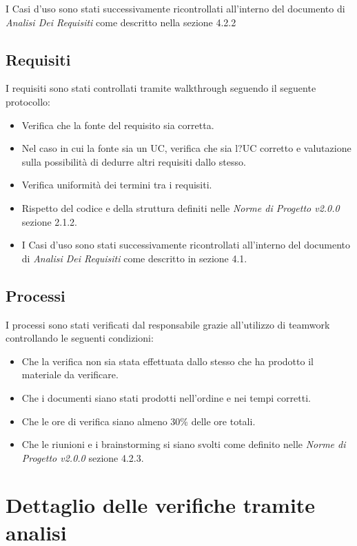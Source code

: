 \documentclass[a4paper]{article}
\begin{document}
				I Casi d'uso sono stati successivamente ricontrollati all'interno del documento di \emph{Analisi Dei Requisiti} come
				descritto nella sezione 4.2.2
			\subsection{Requisiti}
				I requisiti sono stati controllati tramite walkthrough seguendo il seguente protocollo:
					\begin{itemize}
						\item Verifica che la fonte del requisito sia corretta.
						\item Nel caso in cui la fonte sia un UC, verifica che sia l?UC corretto e valutazione
	 sulla possibilità di dedurre altri requisiti dallo stesso.
						\item Verifica uniformità dei termini tra i requisiti.
						\item Rispetto del codice e della struttura definiti nelle \emph{Norme di Progetto v2.0.0} sezione 2.1.2.
						\item I Casi d'uso sono stati successivamente ricontrollati all'interno del documento di \emph{Analisi Dei Requisiti} 
						come descritto in sezione 4.1.
					\end{itemize}
			\subsection{Processi}
				I processi sono stati verificati dal responsabile grazie all'utilizzo di teamwork controllando le seguenti condizioni:
				\begin{itemize}
					\item Che la verifica non sia stata effettuata dallo stesso che ha prodotto il materiale da verificare.
					\item Che i documenti siano stati prodotti nell'ordine e nei tempi corretti.
					\item Che le ore di verifica siano almeno 30\% delle ore totali.
					\item Che le riunioni e i brainstorming si siano svolti come definito nelle \emph{Norme di Progetto v2.0.0} sezione 4.2.3.
				\end{itemize}
				
		
		\section{Dettaglio delle verifiche tramite analisi}
\end{document}
